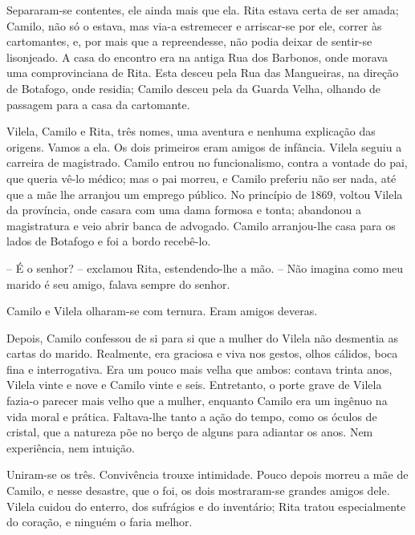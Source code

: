 Separaram-se contentes, ele ainda mais que ela. Rita estava certa de ser
amada; Camilo, não só o estava, mas via-a estremecer e arriscar-se por
ele, correr às cartomantes, e, por mais que a repreendesse, não podia
deixar de sentir-se lisonjeado. A casa do encontro era na antiga Rua dos
Barbonos, onde morava uma comprovinciana de Rita. Esta desceu pela Rua
das Mangueiras, na direção de Botafogo, onde residia; Camilo desceu pela
da Guarda Velha, olhando de passagem para a casa da cartomante.

Vilela, Camilo e Rita, três nomes, uma aventura e nenhuma explicação das
origens. Vamos a ela. Os dois primeiros eram amigos de infância. Vilela
seguiu a carreira de magistrado. Camilo entrou no funcionalismo, contra
a vontade do pai, que queria vê-lo médico; mas o pai morreu, e Camilo
preferiu não ser nada, até que a mãe lhe arranjou um emprego público. No
princípio de 1869, voltou Vilela da província, onde casara com uma dama
formosa e tonta; abandonou a magistratura e veio abrir banca de
advogado. Camilo arranjou-lhe casa para os lados de Botafogo e foi a
bordo recebê-lo.

-- É o senhor? -- exclamou Rita, estendendo-lhe a mão. -- Não imagina
como meu marido é seu amigo, falava sempre do senhor.

Camilo e Vilela olharam-se com ternura. Eram amigos deveras.

Depois, Camilo confessou de si para si que a mulher do Vilela não
desmentia as cartas do marido. Realmente, era graciosa e viva nos
gestos, olhos cálidos, boca fina e interrogativa. Era um pouco mais
velha que ambos: contava trinta anos, Vilela vinte e nove e Camilo vinte
e seis. Entretanto, o porte grave de Vilela fazia-o parecer mais velho
que a mulher, enquanto Camilo era um ingênuo na vida moral e prática.
Faltava-lhe tanto a ação do tempo, como os óculos de cristal, que a
natureza põe no berço de alguns para adiantar os anos. Nem experiência,
nem intuição.

Uniram-se os três. Convivência trouxe intimidade. Pouco depois morreu a
mãe de Camilo, e nesse desastre, que o foi, os dois mostraram-se grandes
amigos dele. Vilela cuidou do enterro, dos sufrágios e do inventário;
Rita tratou especialmente do coração, e ninguém o faria melhor.

